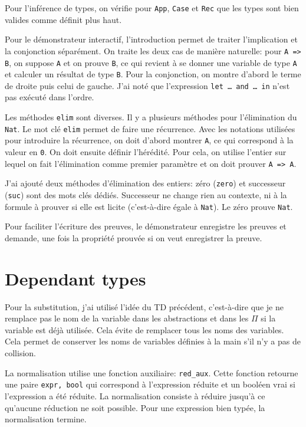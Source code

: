 \documentclass[a4paper]{article}
\begin{document}
    Pour l'inférence de types, on vérifie pour \verb|App|, \verb|Case| et \verb|Rec| que les types sont bien valides comme définit plus haut. 

    Pour le démonstrateur interactif, l'introduction permet de traiter l'implication et la conjonction séparément. On traite les deux cas de manière naturelle: pour \verb|A => B|, on suppose \verb|A| et on prouve \verb|B|, ce qui revient à se donner une variable de type \verb|A| et calculer un résultat de type \verb|B|. Pour la conjonction, on montre d'abord le terme de droite puis celui de gauche. J'ai noté que l'expression \verb-let … and … in- n'est pas exécuté dans l'ordre. 


    Les méthodes \verb|elim| sont diverses. Il y a plusieurs méthodes pour l'élimination du \verb|Nat|. Le mot clé \verb|elim| permet de faire une récurrence. Avec les notations utilisées pour introduire la récurrence, on doit d'abord montrer \verb|A|, ce qui correspond à la valeur en \verb|0|. On doit ensuite définir l'hérédité. Pour cela, on utilise l'entier sur lequel on fait l'élimination comme premier paramètre et on doit prouver \verb|A => A|. 

    J'ai ajouté deux méthodes d'élimination des entiers: zéro (\verb|zero|) et successeur (\verb|suc|) sont des mots clés dédiés. Successeur ne change rien au contexte, ni à la formule à prouver si elle est licite (c'est-à-dire égale à \verb|Nat|). Le zéro prouve \verb|Nat|.

    Pour faciliter l'écriture des preuves, le démonstrateur enregistre les preuves et demande, une fois la propriété prouvée si on veut enregistrer la preuve. 


    \section{Dependant types}

    Pour la substitution, j'ai utilisé l'idée du TD précédent, c'est-à-dire que je ne remplace pas le nom de la variable dans les abstractions et dans les $\Pi$ si la variable est déjà utilisée. Cela évite de remplacer tous les noms des variables. Cela permet de conserver les noms de variables définies à la main s'il n'y a pas de collision. 

    La normalisation utilise une fonction auxiliaire: \verb|red_aux|. Cette fonction retourne une paire \verb|expr, bool| qui correspond à l'expression réduite et un booléen vrai si l'expression a été réduite. La normalisation consiste à réduire jusqu'à ce qu'aucune réduction ne soit possible. Pour une expression bien typée, la normalisation termine.
\end{document}
